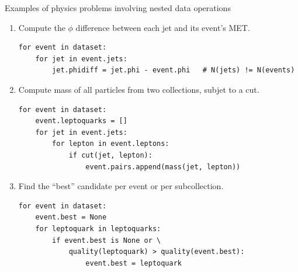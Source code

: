 \documentclass[aspectratio=169]{beamer}
\begin{document}
\begin{frame}[fragile]{Examples of physics problems involving nested data operations}
\vspace{0.15 cm}
\begin{enumerate}
\item Compute the $\phi$ difference between each jet and its event's MET.
\small
\begin{verbatim}
for event in dataset:
    for jet in event.jets:
        jet.phidiff = jet.phi - event.phi   # N(jets) != N(events)
\end{verbatim}
\normalsize

\vspace{0.1 cm}
\item<2-> Compute mass of all particles from two collections, subjet to a cut.
\small
\begin{verbatim}
for event in dataset:
    event.leptoquarks = []
    for jet in event.jets:
        for lepton in event.leptons:
            if cut(jet, lepton):
                event.pairs.append(mass(jet, lepton))
\end{verbatim}
\normalsize

\vspace{0.1 cm}
\item<3-> Find the ``best'' candidate per event or per subcollection.
\small
\begin{verbatim}
for event in dataset:
    event.best = None
    for leptoquark in leptoquarks:
        if event.best is None or \
            quality(leptoquark) > quality(event.best):
                event.best = leptoquark
\end{verbatim}
\normalsize
\end{enumerate}
\end{frame}
\end{document}
